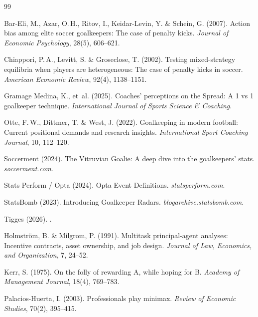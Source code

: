 \documentclass[12pt,a4paper]{article}
\begin{document}
\begin{thebibliography}{99}

Bar-Eli, M., Azar, O.\,H., Ritov, I., Keidar-Levin, Y. \& Schein, G. (2007).
\newblock Action bias among elite soccer goalkeepers: The case of penalty kicks.
\newblock \emph{Journal of Economic Psychology}, 28(5), 606--621.

Chiappori, P.\,A., Levitt, S. \& Groseclose, T. (2002).
\newblock Testing mixed-strategy equilibria when players are heterogeneous: The case of penalty kicks in soccer.
\newblock \emph{American Economic Review}, 92(4), 1138--1151.

Gramage Medina, K., et~al. (2025).
\newblock Coaches' perceptions on the Spread: A 1 vs 1 goalkeeper technique.
\newblock \emph{International Journal of Sports Science \& Coaching}.

Otte, F.\,W., Dittmer, T. \& West, J. (2022).
\newblock Goalkeeping in modern football: Current positional demands and research insights.
\newblock \emph{International Sport Coaching Journal}, 10, 112--120.

Soccerment (2024).
\newblock The Vitruvian Goalie: A deep dive into the goalkeepers' stats.
\newblock \emph{soccerment.com}.

Stats Perform / Opta (2024).
\newblock Opta Event Definitions.
\newblock \emph{statsperform.com}.

StatsBomb (2023).
\newblock Introducing Goalkeeper Radars.
\newblock \emph{blogarchive.statsbomb.com}.

Tigges (2026).
.

Holmstr\"om, B. \& Milgrom, P. (1991).
\newblock Multitask principal-agent analyses: Incentive contracts, asset ownership, and job design.
\newblock \emph{Journal of Law, Economics, and Organization}, 7, 24--52.

Kerr, S. (1975).
\newblock On the folly of rewarding A, while hoping for B.
\newblock \emph{Academy of Management Journal}, 18(4), 769--783.

Palacios-Huerta, I. (2003).
\newblock Professionals play minimax.
\newblock \emph{Review of Economic Studies}, 70(2), 395--415.


\end{thebibliography}
\end{document}
